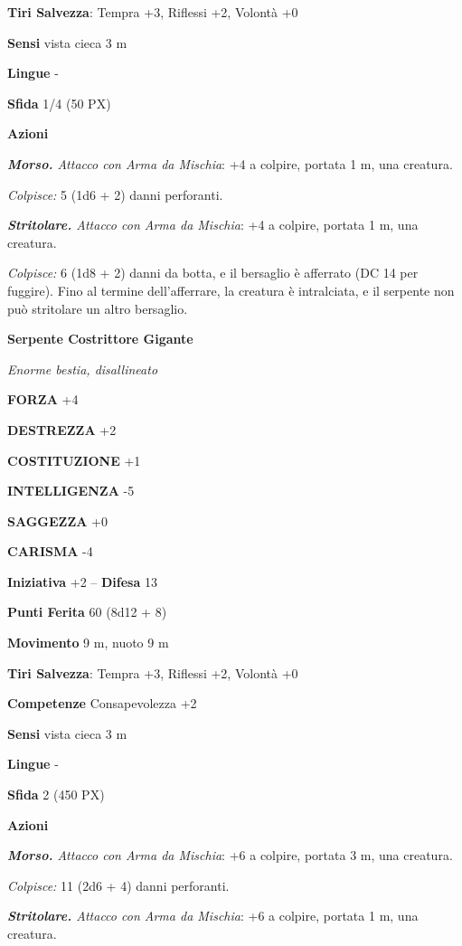 \begin{multicols}{2}
\textbf{Tiri Salvezza}: Tempra +3, Riflessi +2, Volontà +0

\textbf{Sensi} vista cieca 3 m

\textbf{Lingue} -

\textbf{Sfida} 1/4 (50 PX)

\textbf{Azioni}

\textit{\textbf{Morso.} Attacco con Arma da Mischia}: +4 a colpire, portata 1 m, una creatura.

\textit{Colpisce:} 5 (1d6 + 2) danni perforanti.

\textit{\textbf{Stritolare.} Attacco con Arma da Mischia}: +4 a colpire, portata 1 m, una creatura.

\textit{Colpisce:} 6 (1d8 + 2) danni da botta, e il bersaglio è afferrato (DC 14 per fuggire). Fino al termine dell'afferrare, la creatura è intralciata, e il serpente non può stritolare un altro bersaglio.

\medskip\textbf{Serpente Costrittore Gigante}

\textit{Enorme bestia, disallineato}

\textbf{FORZA} +4

\textbf{DESTREZZA} +2

\textbf{COSTITUZIONE} +1

\textbf{INTELLIGENZA} -5

\textbf{SAGGEZZA} +0

\textbf{CARISMA} -4

\textbf{Iniziativa} +2 -- \textbf{Difesa} 13

\textbf{Punti Ferita} 60 (8d12 + 8)

\textbf{Movimento} 9 m, nuoto 9 m

\textbf{Tiri Salvezza}: Tempra +3, Riflessi +2, Volontà +0

\textbf{Competenze} Consapevolezza +2

\textbf{Sensi} vista cieca 3 m

\textbf{Lingue} -

\textbf{Sfida} 2 (450 PX)

\textbf{Azioni}

\textit{\textbf{Morso.} Attacco con Arma da Mischia}: +6 a colpire, portata 3 m, una creatura.

\textit{Colpisce:} 11 (2d6 + 4) danni perforanti.

\textit{\textbf{Stritolare.} Attacco con Arma da Mischia}: +6 a colpire, portata 1 m, una creatura.


\end{multicols}
